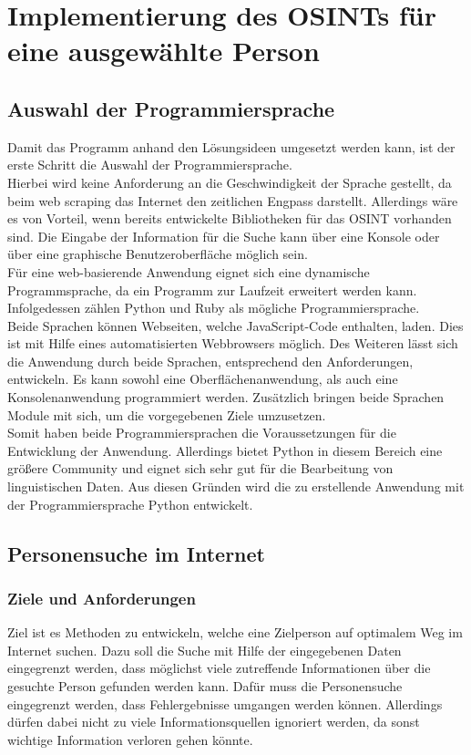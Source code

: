 
\chapter{Implementierung des OSINTs für eine ausgewählte Person}  %
\label{cha:Informationsbeschaffung einer ausgewählten Person} %
\section{Auswahl der Programmiersprache}
Damit das Programm anhand den Lösungsideen umgesetzt werden kann, ist der erste Schritt die Auswahl der Programmiersprache.\\
Hierbei wird keine Anforderung an die Geschwindigkeit der Sprache gestellt, da beim web scraping das Internet den zeitlichen Engpass darstellt. Allerdings wäre es von Vorteil, wenn bereits entwickelte Bibliotheken für das OSINT vorhanden sind. Die Eingabe der Information für die Suche kann über eine Konsole oder über eine graphische Benutzeroberfläche möglich sein.\\
Für eine web-basierende Anwendung eignet sich eine dynamische Programmsprache, da ein Programm zur Laufzeit erweitert werden kann. Infolgedessen zählen Python und Ruby als mögliche Programmiersprache.\\
Beide Sprachen können Webseiten, welche JavaScript-Code enthalten, laden. Dies ist mit Hilfe eines automatisierten Webbrowsers möglich. Des Weiteren lässt sich die Anwendung durch beide Sprachen, entsprechend den Anforderungen, entwickeln. Es kann sowohl eine Oberflächenanwendung, als auch eine Konsolenanwendung programmiert werden. Zusätzlich bringen beide Sprachen Module mit sich, um die vorgegebenen Ziele umzusetzen.\\ Somit haben beide Programmiersprachen die Voraussetzungen für die Entwicklung der Anwendung. Allerdings bietet Python in diesem Bereich eine größere Community und eignet sich sehr gut für die Bearbeitung von linguistischen Daten. \cite{bird2009natural}Aus diesen Gründen wird die zu erstellende Anwendung mit der Programmiersprache Python entwickelt.

\section{Personensuche im Internet}
	\subsection{Ziele und Anforderungen}
	Ziel ist es Methoden zu entwickeln, welche eine Zielperson auf optimalem Weg im Internet suchen. Dazu soll die Suche mit Hilfe der eingegebenen Daten eingegrenzt werden, dass möglichst viele zutreffende Informationen über die gesuchte Person gefunden werden kann. Dafür muss die Personensuche eingegrenzt werden, dass Fehlergebnisse umgangen werden können. Allerdings dürfen dabei nicht zu viele Informationsquellen ignoriert werden, da sonst wichtige Information verloren gehen könnte.
	

